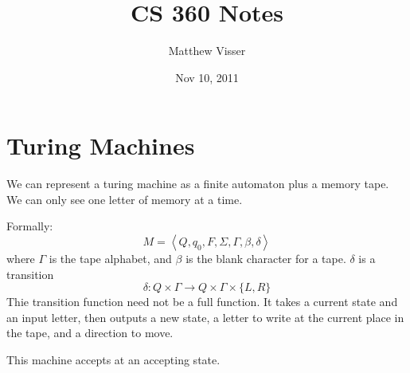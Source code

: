 \documentclass[12pt]{article}
\begin{document}
\title{CS 360 Notes}
\author{Matthew Visser}
\date{Nov 10, 2011}
\maketitle

\section{Turing Machines}

We can represent a turing machine as a finite automaton plus a memory tape. We
can only see one letter of memory at a time.

Formally:
\begin{equation}
	M = \left<Q,q_0,F,\Sigma,\Gamma,\beta,\delta\right>
\end{equation}
where $\Gamma$ is the tape alphabet, and $\beta$ is the blank character for a tape.
$\delta$ is a transition
\begin{equation}
	\delta: Q \times \Gamma \to Q \times \Gamma \times \{L,R\}
\end{equation}
Thie transition function need not be a full function. It takes a current state
and an input letter, then outputs a new state, a letter to write at the current
place in the tape, and a direction to move.

This machine accepts at an accepting state.
\end{document}
